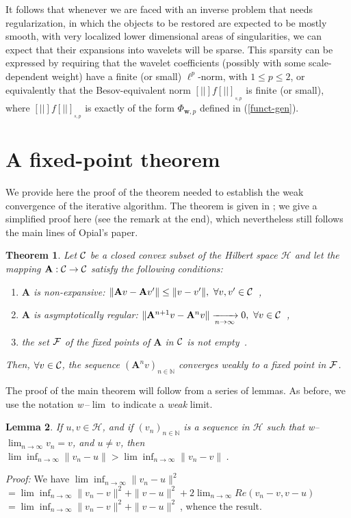 \documentclass[10pt]{article}
\newtheorem{theorem}{Theorem}[section]
\newtheorem{lemma}[theorem]{Lemma}
\newcommand{\QED}{\hfill \raisebox{-2pt}{\rule{5.6pt}{8pt}\rule{4pt}{0pt}}%
  \smallskip\par}
\def\N{\mathbb{N}}
\def\A{\mathbf{A}}
\def\cH{\mathcal{H}}
\newcommand\eref[1]{(\ref{#1})}
\def\VVert{[\!|\!|\!]}
\begin{document}
It follows that whenever we are faced with an inverse problem
that needs regularization,
in which the objects to be restored are expected to be mostly smooth,
with very localized
lower dimensional areas of singularities, 
we can expect that their expansions into wavelets
will be sparse. This sparsity can be expressed by requiring that
the wavelet coefficients (possibly with some scale-dependent weight)
have a finite (or small) $\ell^p$-norm,
with $1\leq p \leq 2$, or equivalently that  the Besov-equivalent norm $\VVert f
\VVert_{_{s,p}}$ is finite (or small), where $\VVert f \VVert_{_{s,p}}$
is exactly of the form
$\Phi_{\mathbf w,p}$ defined in \eref{funct-gen}.
 
\section{ A fixed-point theorem}
\label{Opial}

We provide here the proof of the theorem needed to establish the weak
convergence of the iterative algorithm. The theorem is given in \cite{Opi67};
we give a simplified proof here (see the remark at the end),
which nevertheless still follows the
main lines of Opial's paper.

\begin{theorem}
\label{FPThm}
Let ${\cal C}$ be a closed convex subset of the Hilbert space $\cH$ and let
the mapping $\A : {\cal C} \to {\cal C}$ satisfy the following conditions:
\begin{enumerate}
\item[{\rm (i)}] $\A $ is non-expansive: $\| \A  v -  \A
 v' \| \leq \| v - v'\|,\ \forall v,v' \in {\cal C}$~,
\item[\rm{ (ii)}] $\A $ is asymptotically regular: $\| \A ^{n+1}
v -\A ^n v\| \xrightarrow[n \to \infty]{~} 0,\ \forall v \in
{\cal C}$~,
\item[\rm{ (iii)}] the set ${\cal F}$ of the fixed points of $\A $ in
${\cal C}$ is not empty~.
\end{enumerate}
Then, $\forall v \in \cal C$, the sequence $(\A ^n v)_{n \in \mathbb{N}}$
converges weakly to a fixed point in ${\cal F}$.
\end{theorem}
The proof of the main theorem will follow from a series of lemmas.
As before, we use the notation {\em w}$\,$--$\lim$ to indicate a {\em weak}
limit.
\begin{lemma}
\label{FP1}
If $u,v \in\cH$, and if $(v_n)_{n \in \N}$ is a sequence in $\cH$ such that
w--$\lim_{n \to \infty}v_n = v$, and $u \neq
v$, then
$\lim\inf_{n \to \infty} \| v_n - u\| > \lim\inf_{n \to \infty}\| v_n - v\|~$.
\end{lemma}
{\em Proof:}
We have $\lim\inf_{n \to \infty}\| v_n - u\|^2 $
$= \lim\inf_{n \to \infty}\| v_n - v\|^2  +
\| v - u\|^2 +  2 \lim_{n \to \infty} Re (v_n-v,v-u)$
$= \lim\inf_{n \to \infty}\| v_n - v\|^2  +\| v - u\|^2~$,
whence the result.
\hfill\QED
\end{document}
